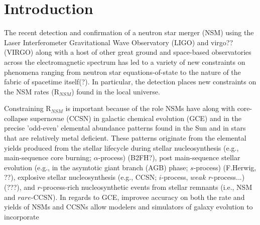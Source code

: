 \section{Introduction}
\label{intro} 
The recent detection and confirmation of a neutron star merger (NSM) using the Laser Interferometer Gravitational Wave Observatory (LIGO) and virgo?? (VIRGO) along with a host of other great ground and space-based observatories across the electromagnetic spectrum has led to a variety of new constraints on phenomena ranging from neutron star equations-of-state to the nature of the fabric of spacetime itself(?). In particular, the detection places new constraints on the NSM rates (R$_{NSM}$) found in the local universe. 

Constraining R$_{NSM}$ is important because of the role NSMs have along with core-collapse supernovae (CCSN) in galactic chemical evolution (GCE) and in the precise 'odd-even' elemental abundance patterns found in the Sun and in stars that are relatively metal deficient. These patterns originate from the elemental yields produced from the stellar lifecycle during stellar nucleosynthesis (e.g., main-sequence core burning; $\alpha$-process) (B2FH?), post main-sequence stellar evolution (e.g., in the asymtotic giant branch (AGB) phase; $s$-process) (F.Herwig, ??), explosive stellar nucleosynthesis (e.g., CCSN; $i$-process, $weak$ $r$-process...) (???), and $r$-process-rich nucleosynthetic events from stellar remnants (i.e., NSM and $rare$-CCSN). In regards to GCE, improvee accuracy on both the rate and yields of NSMs and CCSNs allow modelers and simulators of galaxy evolution to incorporate 

